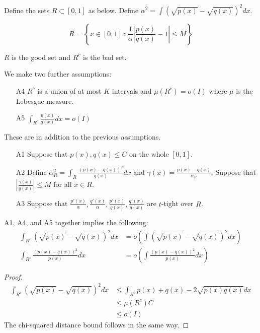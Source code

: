 \documentclass{article}
\begin{document}
Define the sets $R \subset [0,1]$ as below. Define $\alpha^2 = \int (\sqrt{p(x)} - \sqrt{q(x)})^2 dx$. 

$$
R = \left\{ x \in [0,1] \,:\, \frac{1}{\alpha} \left| \frac{p(x)}{q(x)} - 1 \right| 
  \leq M \right \}
$$

 $R$ is the good set and $R^c$ is the bad set. 


We make two further assumptions:

\begin{enumerate}
\item[A4] $R^c$ is a union of at most $K$ intervals and $\mu(R^c) = o(I)$ where $\mu$ is the Lebesgue measure.
\item[A5] $\int_{R^c} \frac{p(x)}{q(x)} dx = o(I)$
\end{enumerate}

These are in addition to the previous assumptions.

\begin{enumerate}
\item[A1] Suppose that $p(x), q(x) \leq C$ on the whole $[0,1]$.
\item[A2] Define $\alpha_R^2 = \int_R \frac{(p(x) - q(x))^2}{q(x)}dx$ and 
          $\gamma(x) = \frac{p(x)-q(x)}{\alpha_R}$. Suppose that $| \frac{\gamma(x)}{q(x)} | \leq M$ for all $x \in R$. 
\item[A3] Suppose that $\frac{p'(x)}{\alpha}, \frac{q'(x)}{\alpha}, \frac{p'(x)}{q(x)}, \frac{q'(x)}{q(x)}$ are $t$-tight over $R$. 
\end{enumerate}

\begin{proposition}
A1, A4, and A5 together implies the following:
\begin{align*}
\int_{R^c} (\sqrt{p(x)} - \sqrt{q(x)})^2 dx &= o\left( \int (\sqrt{p(x)} - \sqrt{q(x)})^2 dx \right)   \\
\int_{R^c} \frac{(p(x) - q(x))^2}{p(x)} dx &= o\left( \int \frac{(p(x) - q(x))^2}{p(x)} dx \right) 
\end{align*}
\end{proposition}


\begin{proof}

\begin{align*}
\int_{R^c} (\sqrt{p(x)} - \sqrt{q(x)})^2 dx &\leq \int_{R^c} p(x) + q(x) - 2\sqrt{p(x)q(x)} dx \\
  &\leq \mu(R^c) C \\
  &\leq o(I)
\end{align*}
The chi-squared distance bound follows in the same way.

\end{proof}
\end{document}
